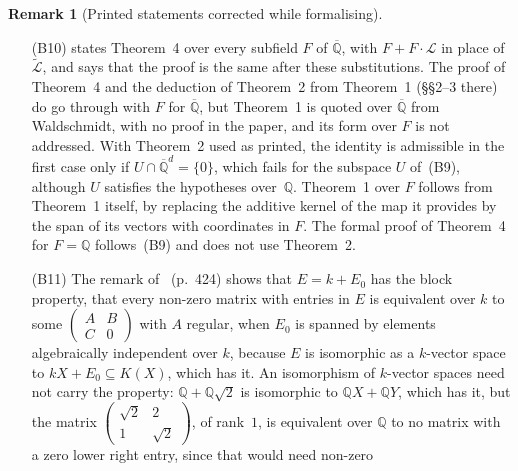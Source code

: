 \documentclass[11pt,a4paper]{article}
\theoremstyle{plain}
\theoremstyle{definition}
\newtheorem{remark}[theorem]{Remark}
\newcommand{\C}{\mathbb{C}}
\newcommand{\Q}{\mathbb{Q}}
\newcommand{\Alg}{\overline{\mathbb{Q}}}
\newcommand{\Logs}{\mathcal{L}}
\newcommand{\aLogs}{\widetilde{\mathcal{L}}}
\begin{document}
\begin{remark}[Printed statements corrected while formalising]
\begin{itemize}
example refutes the inference, not the inequality, and the proposition is true:
\cite[Theorem~11.21]{waldschmidt-book} applied directly, with its additive part replaced by the span of its rational
vectors as in~(B3), proves the first case with no selection, and the reduction to the first case uses subspaces
rational over $\Q$ only. Corollary~11.15 and Proposition~11.19 for $\Q$ are machine-checked along that route, the
latter through Roy's Theorem~4 for $F=\Q$~\cite[Remark~(i), p.~37]{roy-1992}; Roy's own proof of that case goes
through his Theorem~2, which for $F=\Q$ needs his Theorem~1 over~$\Q$~(B10). For $\Alg$ and $\aLogs$ the printed
step is right, by Lemma~11.18\,(3).
\item[(B10)] \cite[Remark~(i), p.~37]{roy-1992} states Theorem~4 over every subfield $F$ of $\Alg$, with
$F+F\cdot\Logs$ in place of $\aLogs$, and says that the proof is the same after these substitutions. The proof of
Theorem~4 and the deduction of Theorem~2 from Theorem~1 (\S\S2--3 there) do go through with $F$ for $\Alg$, but
Theorem~1 is quoted over $\Alg$ from Waldschmidt, with no proof in the paper, and its form over $F$ is not
addressed. With Theorem~2 used as printed, the identity is admissible in the first case only if
$U\cap\Alg^{d}=\{0\}$, which fails for the subspace $U$ of~(B9), although $U$ satisfies the hypotheses over~$\Q$.
Theorem~1 over $F$ follows from Theorem~1 itself, by replacing the additive kernel of the map it provides by the
span of its vectors with coordinates in $F$. The formal proof of Theorem~4 for $F=\Q$ follows~(B9) and does not use
Theorem~2.
\item[(B11)] The remark of~\cite[\S12.1.3]{waldschmidt-book} (p.~424) shows that $E=k+E_{0}$ has the block property,
that every non-zero matrix with entries in $E$ is equivalent over $k$ to some
$\left(\begin{smallmatrix}A&B\\C&0\end{smallmatrix}\right)$ with $A$ regular, when $E_{0}$ is spanned by elements
algebraically independent over $k$, because $E$ is isomorphic as a $k$-vector space to $kX+E_{0}\subseteq K(X)$, which
has it. An isomorphism of $k$-vector spaces need not carry the property: $\Q+\Q\sqrt{2}$ is isomorphic to
$\Q X+\Q Y$, which has it, but the matrix $\left(\begin{smallmatrix}\sqrt{2}&2\\1&\sqrt{2}\end{smallmatrix}\right)$,
of rank~$1$, is equivalent over $\Q$ to no matrix with a zero lower right entry, since that would need non-zero

\end{itemize}
\end{remark}
\end{document}
